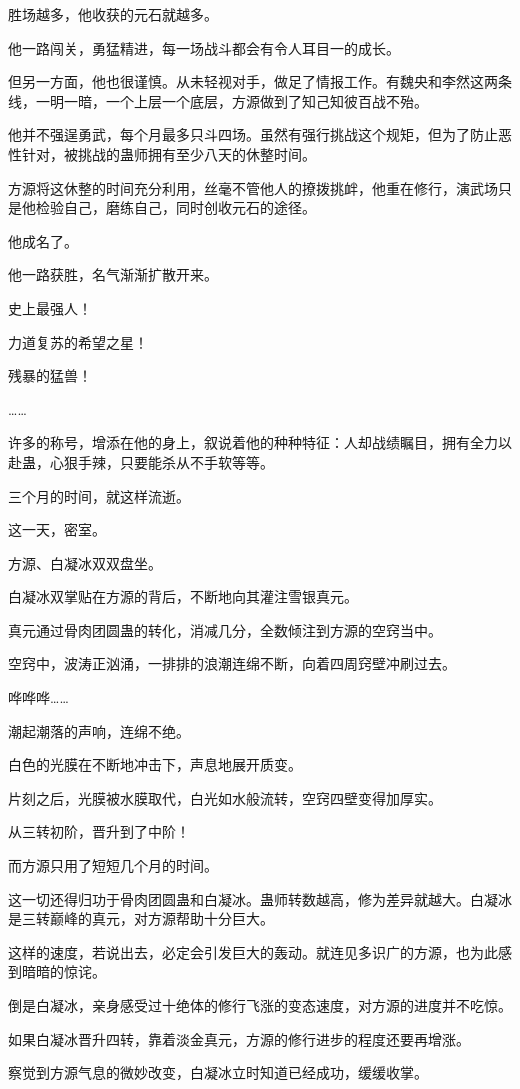 \begin{this_body}
胜场越多，他收获的元石就越多。

他一路闯关，勇猛精进，每一场战斗都会有令人耳目一的成长。

但另一方面，他也很谨慎。从未轻视对手，做足了情报工作。有魏央和李然这两条线，一明一暗，一个上层一个底层，方源做到了知己知彼百战不殆。

他并不强逞勇武，每个月最多只斗四场。虽然有强行挑战这个规矩，但为了防止恶性针对，被挑战的蛊师拥有至少八天的休整时间。

方源将这休整的时间充分利用，丝毫不管他人的撩拨挑衅，他重在修行，演武场只是他检验自己，磨练自己，同时创收元石的途径。

他成名了。

他一路获胜，名气渐渐扩散开来。

史上最强人！

力道复苏的希望之星！

残暴的猛兽！

……

许多的称号，增添在他的身上，叙说着他的种种特征：人却战绩瞩目，拥有全力以赴蛊，心狠手辣，只要能杀从不手软等等。

三个月的时间，就这样流逝。

这一天，密室。

方源、白凝冰双双盘坐。

白凝冰双掌贴在方源的背后，不断地向其灌注雪银真元。

真元通过骨肉团圆蛊的转化，消减几分，全数倾注到方源的空窍当中。

空窍中，波涛正汹涌，一排排的浪潮连绵不断，向着四周窍壁冲刷过去。

哗哗哗……

潮起潮落的声响，连绵不绝。

白色的光膜在不断地冲击下，声息地展开质变。

片刻之后，光膜被水膜取代，白光如水般流转，空窍四壁变得加厚实。

从三转初阶，晋升到了中阶！

而方源只用了短短几个月的时间。

这一切还得归功于骨肉团圆蛊和白凝冰。蛊师转数越高，修为差异就越大。白凝冰是三转巅峰的真元，对方源帮助十分巨大。

这样的速度，若说出去，必定会引发巨大的轰动。就连见多识广的方源，也为此感到暗暗的惊诧。

倒是白凝冰，亲身感受过十绝体的修行飞涨的变态速度，对方源的进度并不吃惊。

如果白凝冰晋升四转，靠着淡金真元，方源的修行进步的程度还要再增涨。

察觉到方源气息的微妙改变，白凝冰立时知道已经成功，缓缓收掌。


\end{this_body}
